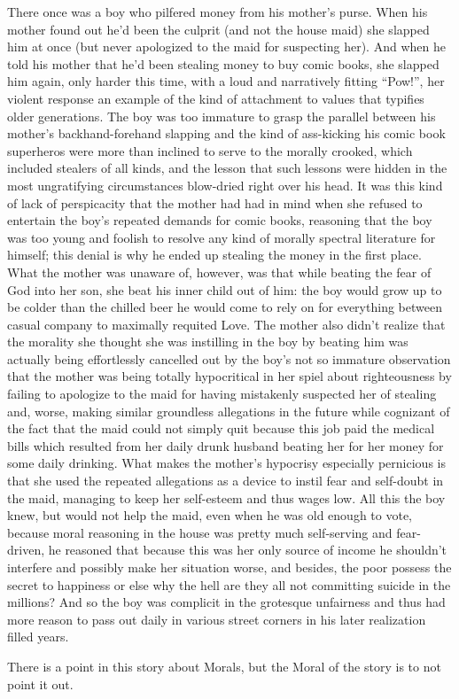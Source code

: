 \documentclass{article}
\begin{document}
\newline

There once was a boy who pilfered money from his mother's purse. When
his mother found out he'd been the culprit (and not the house maid) she
slapped him at once (but never apologized to the maid for suspecting
her). And when he told his mother that he'd been stealing money to buy
comic books, she slapped him again, only harder this time, with a loud
and narratively fitting ``Pow!'', her violent response an example of the
kind of attachment to values that typifies older generations. The boy
was too immature to grasp the parallel between his mother's
backhand-forehand slapping and the kind of ass-kicking his comic book
superheros were more than inclined to serve to the morally crooked,
which included stealers of all kinds, and the lesson that such lessons
were hidden in the most ungratifying circumstances blow-dried right over
his head. It was this kind of lack of perspicacity that the mother had
had in mind when she refused to entertain the boy's repeated demands for
comic books, reasoning that the boy was too young and foolish to resolve
any kind of morally spectral literature for himself; this denial is why
he ended up stealing the money in the first place. What the mother was
unaware of, however, was that while beating the fear of God into her
son, she beat his inner child out of him: the boy would grow up to be
colder than the chilled beer he would come to rely on for everything
between casual company to maximally requited Love. The mother also
didn't realize that the morality she thought she was instilling in the
boy by beating him was actually being effortlessly cancelled out by the
boy's not so immature observation that the mother was being totally
hypocritical in her spiel about righteousness by failing to apologize to
the maid for having mistakenly suspected her of stealing and, worse,
making similar groundless allegations in the future while cognizant of
the fact that the maid could not simply quit because this job paid the
medical bills which resulted from her daily drunk husband beating her
for her money for some daily drinking. What makes the mother's hypocrisy
especially pernicious is that she used the repeated allegations as
a device to instil fear and self-doubt in the maid, managing to keep her
self-esteem and thus wages low. All this the boy knew, but would not
help the maid, even when he was old enough to vote, because moral
reasoning in the house was pretty much self-serving and fear-driven, he
reasoned that because this was her only source of income he shouldn't
interfere and possibly make her situation worse, and besides, the poor
possess the secret to happiness or else why the hell are they all not
committing suicide in the millions? And so the boy was complicit in the
grotesque unfairness and thus had more reason to pass out daily in
various street corners in his later realization filled years.

\newline\newline

There is a point in this story about Morals, but the Moral of the story
is to not point it out.
\end{document}
